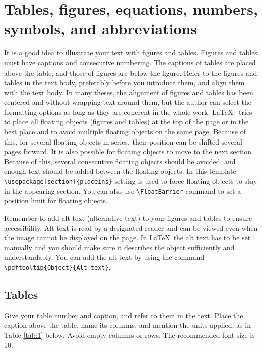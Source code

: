 \section{Tables, figures, equations, numbers, symbols, and abbreviations }\label{App:C}

It is a good idea to illustrate your text with figures and tables. Figures and tables must have captions and consecutive numbering. The captions of tables are placed above the table, and those of figures are below the figure. Refer to the figures and tables in the text body, preferably before you introduce them, and align them with the text body. In many theses, the alignment of figures and tables has been centered and without wrapping text around them, but the author can select the formatting options as long as they are coherent in the whole work. \LaTeX~ tries to place all floating objects (figures and tables) at the top of the page or in the best place and to avoid multiple floating objects on the same page. Because of this, for several floating objects in series, their position can be shifted several pages forward. It is also possible for floating objects to move to the next section. Because of this, several consecutive floating objects should be avoided, and enough text should be added between the floating objects. In this template \verb|\usepackage[section]{placeins}| setting is used to force floating objects to stay in the appearing section. You can also use \verb|\FloatBarrier| command to set a position limit for floating objects.

Remember to add alt text (alternative text) to your figures and tables to ensure accessibility. Alt text is read by a designated reader and can be viewed even when the image cannot be displayed on the page. In \LaTeX~the alt text has to be set manually and you should make sure it describes the object sufficiently and understandably. You can add the alt text by using the command \verb|\pdftooltip{Object}{Alt-text}|.

\subsection*{Tables}
Give your table number and caption, and refer to them in the text. Place the caption above the table, name its columns, and mention the units applied, as in Table \ref{tab:1} below. Avoid empty columns or rows. The recommended font size is 10.

